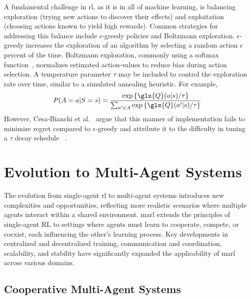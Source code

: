 A fundamental challenge in \gls{rl}, as it is in all of machine learning, 
is balancing exploration (trying new actions to discover their effects) 
and exploitation (choosing actions known to yield high rewards). 
Common strategies for addressing this balance include \(\epsilon\)-greedy 
policies and Boltzmann exploration.
\(\epsilon\)-greedy increases the exploration of an algorithm by selecting
a random action \(\epsilon\) percent of the time.
%
Boltzmann exploration, commonly using a softmax function~\cite{pan2021}, 
normalizes estimated action-values to reduce bias during action selection. 
A temperature parameter \(\tau\) may be included to control the exploration 
rate over time, similar to a simulated annealing heuristic. 
For example,
%
\begin{equation}
    P(A=a|S=s) =
    \frac{\exp\left\{\gls{Q}(a|s)/\tau\right\}}{
        \sum_{a^\prime\in A}\exp\left\{\gls{Q}(a^\prime|s)/\tau\right\}}
    \label{eq:softmax_action-value}
\end{equation}
However, Cesa-Bianchi et al.~\cite{cesa-bianchi2017} argue that this manner 
of implementation fails to minimize regret compared to \(\epsilon\)-greedy 
and attribute it to the difficulty in tuning a \(\tau\) decay schedule~
\cite{kaelbling1996,vermorel2005}.


\section{Evolution to Multi-Agent Systems}%


The evolution from single-agent \gls{rl} to multi-agent systems introduces new 
complexities and opportunities, reflecting more realistic scenarios where 
multiple agents interact within a shared environment. \Gls{marl} extends the 
principles of single-agent RL to settings where agents must learn to 
cooperate, compete, or coexist, each influencing the other's learning process.
Key developments in centralized and decentralized training, communication and 
coordination, scalability, and stability have significantly expanded the 
applicability of \gls{marl} across various domains. 

    \subsection*{Cooperative Multi-Agent Systems}%

